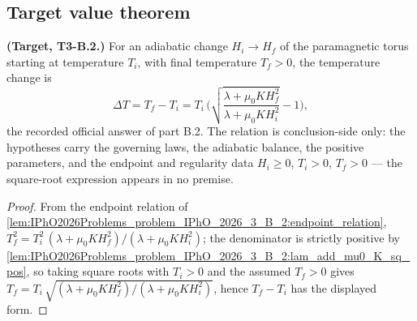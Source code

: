 \subsection*{Target value theorem}

\begin{theorem}
\label{thm:IPhO2026Problems_problem_IPhO_2026_3_B_2:adiabatic_temperature_change}
\textbf{(Target, T3-B.2.)}  For an adiabatic change $H_i \to H_f$ of the
paramagnetic torus starting at temperature $T_i$, with final temperature
$T_f > 0$, the temperature change is
\[
\Delta T = T_f - T_i
  = T_i\,\biggl(\sqrt{\frac{\lambda + \mu_0 K H_f^2}
                          {\lambda + \mu_0 K H_i^2}} - 1\biggr),
\]
the recorded official answer of part B.2.  The relation is conclusion-side
only: the hypotheses carry the governing laws, the adiabatic balance, the
positive parameters, and the endpoint and regularity data $H_i \ge 0$,
$T_i > 0$, $T_f > 0$ --- the square-root expression appears in no premise.
\end{theorem}
\begin{proof}
From the endpoint relation of
\cref{lem:IPhO2026Problems_problem_IPhO_2026_3_B_2:endpoint_relation},
$T_f^2 = T_i^2\,(\lambda + \mu_0 K H_f^2)/(\lambda + \mu_0 K H_i^2)$; the
denominator is strictly positive by
\cref{lem:IPhO2026Problems_problem_IPhO_2026_3_B_2:lam_add_mu0_K_sq_pos}, so
taking square roots with $T_i > 0$ and the assumed $T_f > 0$ gives
$T_f = T_i\,\sqrt{(\lambda + \mu_0 K H_f^2)/(\lambda + \mu_0 K H_i^2)}$,
hence $T_f - T_i$ has the displayed form.
\end{proof}
